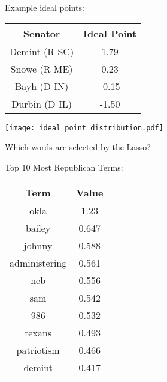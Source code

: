 \documentclass[xcolor=pdftex,dvipsnames,table]{beamer}
\begin{document}
\frame
{
  	Example ideal points:
	\begin{table}[htdp]
	\begin{center}
	\begin{tabular}{|c|c|}
	\hline
	Senator & Ideal Point \\
	\hline
  	Demint (R SC) & 1.79 \\
	Snowe (R ME) & 0.23 \\
	Bayh (D IN) & -0.15 \\
	Durbin (D IL) & -1.50 \\
	\hline
	\end{tabular}
	\end{center}
	\end{table}
}

\frame
{
	\begin{center}
		\texttt{[image: ideal\_point\_distribution.pdf]}
	\end{center}
}

\frame
{
	Which words are selected by the Lasso?
}

\frame
{
	Top 10 Most Republican Terms:
	\begin{table}[htdp]
	\begin{center}
	\begin{tabular}{|c|c|}
	\hline
	Term & Value \\ 
	\hline
	okla & 1.23 \\
	bailey & 0.647 \\
	johnny & 0.588 \\
	administering & 0.561 \\
	neb & 0.556 \\
	sam & 0.542 \\
	986 & 0.532 \\
	texans & 0.493 \\
	patriotism & 0.466 \\
	demint & 0.417 \\
	\hline
	\end{tabular}
	\end{center}
	\label{default}
	\end{table}
}
\end{document}
